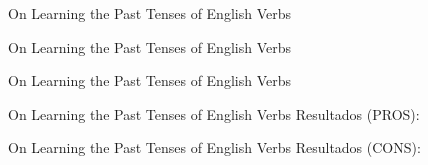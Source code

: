 \documentclass[10pt]{beamer}
\begin{document}
\begin{frame}[fragile]{On Learning the Past Tenses of English Verbs \cite{Rumelhart:1986:PDP:21935}}

\end{frame}


\begin{frame}[fragile]{On Learning the Past Tenses of English Verbs \cite{Rumelhart:1986:PDP:21935}}

\end{frame}

\begin{frame}[fragile]{On Learning the Past Tenses of English Verbs \cite{Rumelhart:1986:PDP:21935}}

\end{frame}


\begin{frame}[fragile]{On Learning the Past Tenses of English Verbs \cite{Rumelhart:1986:PDP:21935}}
Resultados (PROS):

\begin{itemize}
\vspace{0.4cm}
\vspace{0.4cm}
\vspace{0.4cm}
\end{itemize}
\end{frame}

\begin{frame}[fragile]{On Learning the Past Tenses of English Verbs \cite{Rumelhart:1986:PDP:21935}}
Resultados (CONS):

\begin{itemize}
\vspace{0.4cm}
\end{itemize}
\end{frame}
\end{document}
